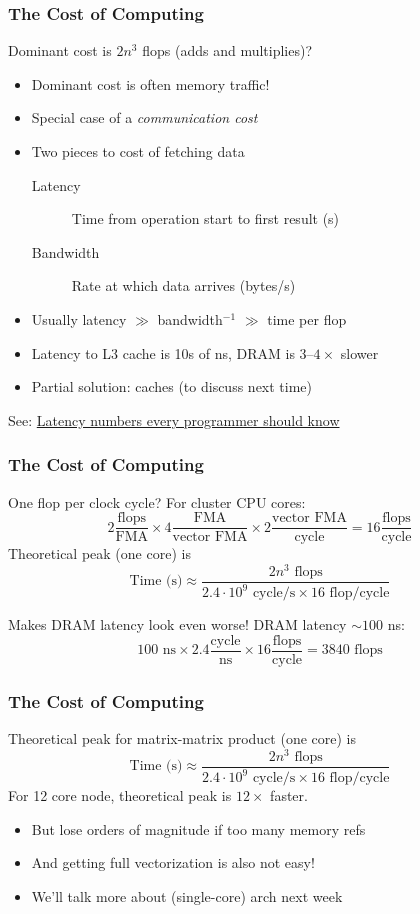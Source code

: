 \documentclass{beamer}
\begin{document}
\begin{frame}
  \frametitle{The Cost of Computing}

  Dominant cost is $2n^3$ flops (adds and multiplies)?
  \begin{itemize}
  \item Dominant cost is often memory traffic!
  \item Special case of a {\em communication cost}
  \item Two pieces to cost of fetching data
    \begin{description}
    \item[Latency] Time from operation start to first result (s)
    \item[Bandwidth] Rate at which data arrives (bytes/s)
    \end{description}
  \item Usually latency $\gg$ bandwidth$^{-1}$ $\gg$ time per flop
  \item Latency to L3 cache is 10s of ns, DRAM is $3$--$4 \times$
    slower
  \item Partial solution: caches (to discuss next time)
  \end{itemize}
  See: \href{https://gist.github.com/jboner/2841832}{Latency numbers every programmer should know}
\end{frame}


\begin{frame}
  \frametitle{The Cost of Computing}
  
  One flop per clock cycle? For cluster CPU cores:
  \[
  2 \frac{\mbox{flops}}{\mbox{FMA}} \times
  4 \frac{\mbox{FMA}}{\mbox{vector FMA}} \times
  2 \frac{\mbox{vector FMA}}{\mbox{cycle}} =
  16 \frac{\mbox{flops}}{\mbox{cycle}}
  \]
  Theoretical peak (one core) is
  \[
  \mbox{Time (s)} \approx
  \frac{2n^3 \mbox{ flops}}
       {2.4 \cdot 10^9 \mbox{ cycle/s} \times 16 \mbox{ flop/cycle}}
  \]

  \vspace{5mm}
  Makes DRAM latency look even worse!
  DRAM latency $\sim 100$ ns:
  \[
  100 \mbox{ ns} \times
  2.4 \frac{\mbox{cycle}}{\mbox{ns}} \times
  16 \frac{\mbox{flops}}{\mbox{cycle}} =
  3840 \mbox{ flops}
  \]

\end{frame}


\begin{frame}
  \frametitle{The Cost of Computing}

  Theoretical peak for matrix-matrix product (one core) is
  \[
    \mbox{Time (s)} \approx
    \frac{2n^3 \mbox{ flops}}
         {2.4 \cdot 10^9 \mbox{ cycle/s} \times 16 \mbox{ flop/cycle}}
  \]
  For 12 core node, theoretical peak is $12 \times$ faster.       
  \begin{itemize}
  \item But lose orders of magnitude if too many memory refs
  \item And getting full vectorization is also not easy!
  \item We'll talk more about (single-core) arch next week
  \end{itemize}

\end{frame}
\end{document}
